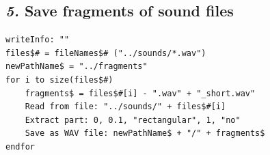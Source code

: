 \documentclass[12pt, english]{article}
\begin{document}
\subsection*{\emph{5.} Save fragments of sound files}

\begin{lstlisting}
writeInfo: ""
files$# = fileNames$# ("../sounds/*.wav")
newPathName$ = "../fragments"
for i to size(files$#)
	fragments$ = files$#[i] - ".wav" + "_short.wav"
	Read from file: "../sounds/" + files$#[i]
	Extract part: 0, 0.1, "rectangular", 1, "no"
	Save as WAV file: newPathName$ + "/" + fragments$
endfor
\end{lstlisting}

\vspace{10pt}
\end{document}
